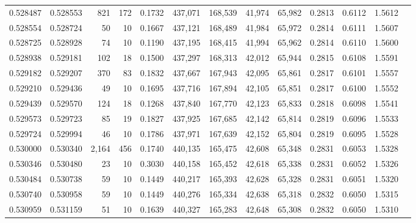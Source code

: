 \begin{tabular}{rrrrrrrrrrrrr}
0.528487 & 0.528553 &   821 & 172 &                                     0.1732 & 437,071 & 168,539 &  41,974 &  65,982 & 0.2813 & 0.6112 & 1.5612 \\
0.528554 & 0.528724 &    50 &  10 &                                     0.1667 & 437,121 & 168,489 &  41,984 &  65,972 & 0.2814 & 0.6111 & 1.5607 \\
0.528725 & 0.528928 &    74 &  10 &                                     0.1190 & 437,195 & 168,415 &  41,994 &  65,962 & 0.2814 & 0.6110 & 1.5600 \\
0.528938 & 0.529181 &   102 &  18 &                                     0.1500 & 437,297 & 168,313 &  42,012 &  65,944 & 0.2815 & 0.6108 & 1.5591 \\
0.529182 & 0.529207 &   370 &  83 &                                     0.1832 & 437,667 & 167,943 &  42,095 &  65,861 & 0.2817 & 0.6101 & 1.5557 \\
0.529210 & 0.529436 &    49 &  10 &                                     0.1695 & 437,716 & 167,894 &  42,105 &  65,851 & 0.2817 & 0.6100 & 1.5552 \\
0.529439 & 0.529570 &   124 &  18 &                                     0.1268 & 437,840 & 167,770 &  42,123 &  65,833 & 0.2818 & 0.6098 & 1.5541 \\
0.529573 & 0.529723 &    85 &  19 &                                     0.1827 & 437,925 & 167,685 &  42,142 &  65,814 & 0.2819 & 0.6096 & 1.5533 \\
0.529724 & 0.529994 &    46 &  10 &                                     0.1786 & 437,971 & 167,639 &  42,152 &  65,804 & 0.2819 & 0.6095 & 1.5528 \\
0.530000 & 0.530340 & 2,164 & 456 &                                     0.1740 & 440,135 & 165,475 &  42,608 &  65,348 & 0.2831 & 0.6053 & 1.5328 \\
0.530346 & 0.530480 &    23 &  10 &                                     0.3030 & 440,158 & 165,452 &  42,618 &  65,338 & 0.2831 & 0.6052 & 1.5326 \\
0.530484 & 0.530738 &    59 &  10 &                                     0.1449 & 440,217 & 165,393 &  42,628 &  65,328 & 0.2831 & 0.6051 & 1.5320 \\
0.530740 & 0.530958 &    59 &  10 &                                     0.1449 & 440,276 & 165,334 &  42,638 &  65,318 & 0.2832 & 0.6050 & 1.5315 \\
0.530959 & 0.531159 &    51 &  10 &                                     0.1639 & 440,327 & 165,283 &  42,648 &  65,308 & 0.2832 & 0.6050 & 1.5310 \\

\end{tabular}
